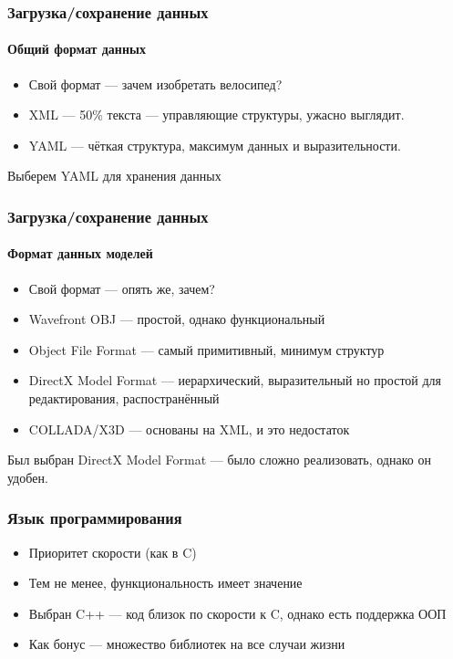 \documentclass{beamer}
\begin{document}
\begin{frame}
\frametitle{Загрузка/сохранение данных}
\framesubtitle{Общий формат данных}

\begin{itemize}
\item Свой формат --- зачем изобретать велосипед?
\item XML --- 50\% текста --- управляющие структуры, ужасно выглядит.
\item YAML --- чёткая структура, максимум данных и выразительности.
\end{itemize}
Выберем YAML для хранения данных
\end{frame}

\begin{frame}
\frametitle{Загрузка/сохранение данных}
\framesubtitle{Формат данных моделей}

\begin{itemize}
\item Свой формат --- опять же, зачем?
\item Wavefront OBJ --- простой, однако функциональный
\item Object File Format --- самый примитивный, минимум структур
\item DirectX Model Format --- иерархический, выразительный но простой для редактирования, распостранённый
\item COLLADA/X3D --- основаны на XML, и это недостаток
\end{itemize}
Был выбран DirectX Model Format --- было сложно реализовать, однако он удобен.
\end{frame}

\begin{frame}
\frametitle{Язык программирования}

\begin{itemize}
\item Приоритет скорости (как в C)
\item Тем не менее, функциональность имеет значение
\item Выбран C++ --- код близок по скорости к C, однако есть поддержка ООП
\item Как бонус --- множество библиотек на все случаи жизни
\end{itemize}
\end{frame}
\end{document}
